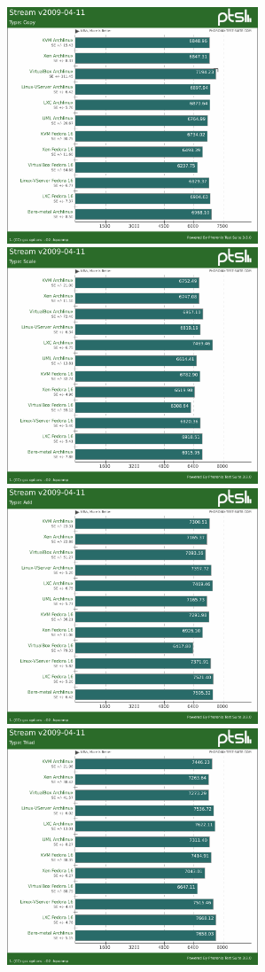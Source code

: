 \begin{figure}[h!]
  \includegraphics[width=75mm]{obr/bench/stream-graph-1}
  \includegraphics[width=75mm]{obr/bench/stream-graph-2}
  \includegraphics[width=75mm]{obr/bench/stream-graph-3}
  \includegraphics[width=75mm]{obr/bench/stream-graph-4}

\end{figure}
